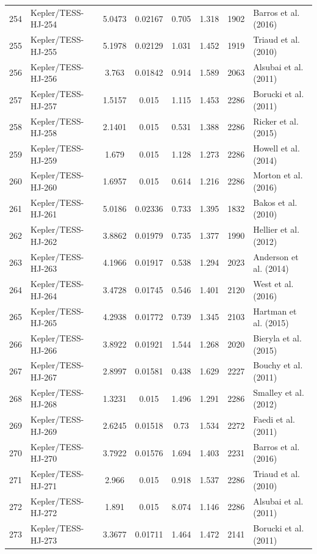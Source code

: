 \begin{longtable}{r l c c c c c p{4.2cm}}
254 & Kepler/TESS-HJ-254 & 5.0473 & 0.02167 & 0.705 & 1.318 & 1902 & Barros et al. (2016) \\
255 & Kepler/TESS-HJ-255 & 5.1978 & 0.02129 & 1.031 & 1.452 & 1919 & Triaud et al. (2010) \\
256 & Kepler/TESS-HJ-256 & 3.763 & 0.01842 & 0.914 & 1.589 & 2063 & Alsubai et al. (2011) \\
257 & Kepler/TESS-HJ-257 & 1.5157 & 0.015 & 1.115 & 1.453 & 2286 & Borucki et al. (2011) \\
258 & Kepler/TESS-HJ-258 & 2.1401 & 0.015 & 0.531 & 1.388 & 2286 & Ricker et al. (2015) \\
259 & Kepler/TESS-HJ-259 & 1.679 & 0.015 & 1.128 & 1.273 & 2286 & Howell et al. (2014) \\
260 & Kepler/TESS-HJ-260 & 1.6957 & 0.015 & 0.614 & 1.216 & 2286 & Morton et al. (2016) \\
261 & Kepler/TESS-HJ-261 & 5.0186 & 0.02336 & 0.733 & 1.395 & 1832 & Bakos et al. (2010) \\
262 & Kepler/TESS-HJ-262 & 3.8862 & 0.01979 & 0.735 & 1.377 & 1990 & Hellier et al. (2012) \\
263 & Kepler/TESS-HJ-263 & 4.1966 & 0.01917 & 0.538 & 1.294 & 2023 & Anderson et al. (2014) \\
264 & Kepler/TESS-HJ-264 & 3.4728 & 0.01745 & 0.546 & 1.401 & 2120 & West et al. (2016) \\
265 & Kepler/TESS-HJ-265 & 4.2938 & 0.01772 & 0.739 & 1.345 & 2103 & Hartman et al. (2015) \\
266 & Kepler/TESS-HJ-266 & 3.8922 & 0.01921 & 1.544 & 1.268 & 2020 & Bieryla et al. (2015) \\
267 & Kepler/TESS-HJ-267 & 2.8997 & 0.01581 & 0.438 & 1.629 & 2227 & Bouchy et al. (2011) \\
268 & Kepler/TESS-HJ-268 & 1.3231 & 0.015 & 1.496 & 1.291 & 2286 & Smalley et al. (2012) \\
269 & Kepler/TESS-HJ-269 & 2.6245 & 0.01518 & 0.73 & 1.534 & 2272 & Faedi et al. (2011) \\
270 & Kepler/TESS-HJ-270 & 3.7922 & 0.01576 & 1.694 & 1.403 & 2231 & Barros et al. (2016) \\
271 & Kepler/TESS-HJ-271 & 2.966 & 0.015 & 0.918 & 1.537 & 2286 & Triaud et al. (2010) \\
272 & Kepler/TESS-HJ-272 & 1.891 & 0.015 & 8.074 & 1.146 & 2286 & Alsubai et al. (2011) \\
273 & Kepler/TESS-HJ-273 & 3.3677 & 0.01711 & 1.464 & 1.472 & 2141 & Borucki et al. (2011) \\

\end{longtable}
